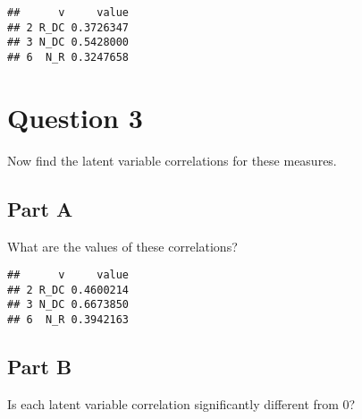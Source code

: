 \documentclass[]{article}
\newenvironment{Shaded}{\begin{snugshade}}{\end{snugshade}}
\newcommand{\KeywordTok}[1]{\textcolor[rgb]{0.13,0.29,0.53}{\textbf{#1}}}
\newcommand{\DataTypeTok}[1]{\textcolor[rgb]{0.13,0.29,0.53}{#1}}
\newcommand{\StringTok}[1]{\textcolor[rgb]{0.31,0.60,0.02}{#1}}
\newcommand{\OtherTok}[1]{\textcolor[rgb]{0.56,0.35,0.01}{#1}}
\newcommand{\OperatorTok}[1]{\textcolor[rgb]{0.81,0.36,0.00}{\textbf{#1}}}
\newcommand{\NormalTok}[1]{#1}
\begin{document}
\begin{verbatim}
##      v     value
## 2 R_DC 0.3726347
## 3 N_DC 0.5428000
## 6  N_R 0.3247658
\end{verbatim}

\section{Question 3}\label{question-3}

Now find the latent variable correlations for these measures.

\subsection{Part A}\label{part-a}

What are the values of these correlations?

\begin{Shaded}
\end{Shaded}

\begin{verbatim}
##      v     value
## 2 R_DC 0.4600214
## 3 N_DC 0.6673850
## 6  N_R 0.3942163
\end{verbatim}

\subsection{Part B}\label{part-b}

Is each latent variable correlation significantly different from 0?

\begin{Shaded}
\end{Shaded}
\end{document}
